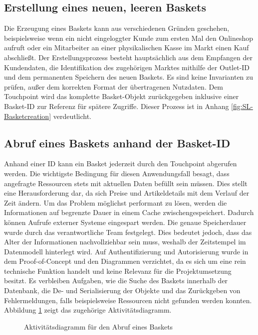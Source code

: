 \subsection{Erstellung eines neuen, leeren Baskets}

Die Erzeugung eines Baskets kann aus verschiedenen Gründen geschehen, beispielsweise wenn ein nicht eingeloggter Kunde zum ersten Mal den Onlineshop aufruft oder ein Mitarbeiter an einer physikalischen Kasse im Markt einen Kauf abschließt. Der Erstellungsprozess besteht hauptsächlich aus dem Empfangen der Kundendaten, die Identifikation des zugehörigen Marktes mithilfe der Outlet-ID und dem permanenten Speichern des neuen Baskets. Es sind keine Invarianten zu prüfen, außer dem korrekten Format der übertragenen Nutzdaten. Dem Touchpoint wird das komplette Basket-Objekt zurückgegeben inklusive einer Basket-ID zur Referenz für spätere Zugriffe. Dieser Prozess ist in Anhang \ref{fig:SL-Basketcreation} verdeutlicht. 

\pagebreak

\subsection{Abruf eines Baskets anhand der Basket-ID}

Anhand einer ID kann ein Basket jederzeit durch den Touchpoint abgerufen werden. Die wichtigste Bedingung für diesen Anwendungsfall besagt, dass angefragte Ressourcen stets mit aktuellen Daten befüllt sein müssen. Dies stellt eine Herausforderung dar, da sich Preise und Artikeldetails mit dem Verlauf der Zeit ändern. Um das Problem möglichst performant zu lösen, werden die Informationen auf begrenzte Dauer in einem Cache zwischengespeichert. Dadurch können Aufrufe externer Systeme eingespart werden. Die genaue Speicherdauer wurde durch das verantwortliche Team festgelegt. Dies bedeutet jedoch, dass das Alter der Informationen nachvollziehbar sein muss, weshalb der Zeitstempel im Datenmodell hinterlegt wird. Auf Authentifizierung und Autorisierung wurde in dem Proof-of-Concept und den Diagrammen verzichtet, da es sich um eine rein technische Funktion handelt und keine Relevanz für die Projektumsetzung besitzt. Es verbleiben Aufgaben, wie die Suche des Baskets innerhalb der Datenbank, die De- und Serialisierung der Objekte und das Zurückgeben von Fehlermeldungen, falls beispielsweise Ressourcen nicht gefunden werden konnten. Abbildung \ref{fig:SL-Basketabruf} zeigt das zugehörige Aktivitätsdiagramm.

\begin{figure}[H]
	\centering
	
	\caption{Aktivitätsdiagramm für den Abruf eines Baskets}
	\label{fig:SL-Basketabruf}
\end{figure}

